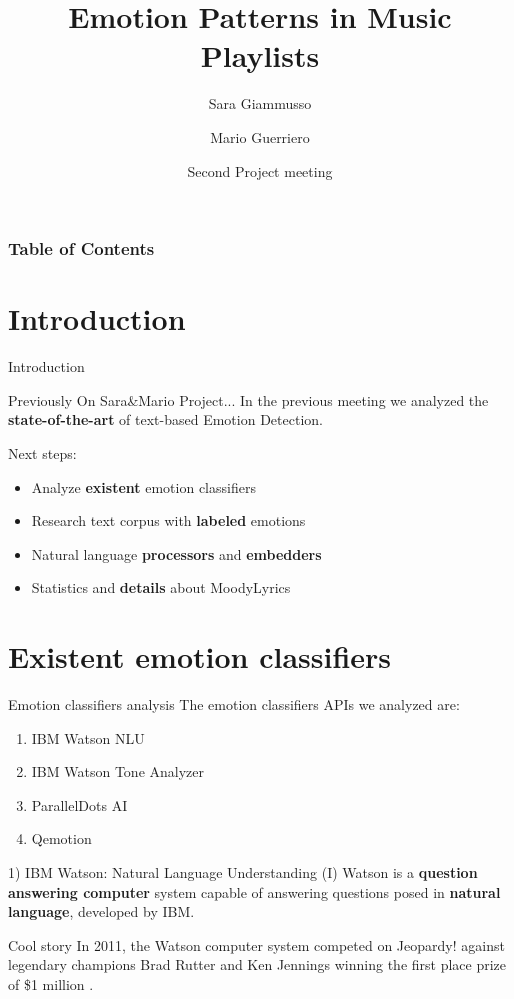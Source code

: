 \documentclass[xcolor=dvipsnames]{beamer}
\title[Emotion Patterns in Music Playlists] %
{Emotion Patterns in Music Playlists}
\author[Sara, Mario] %
{Sara Giammusso\inst{1}\inst{2} \and Mario Guerriero \inst{1}\inst{2}}
\institute[EURECOM] %
{
 \inst{1}
 MSc student in Data Science Department, EURECOM, T\'el\'ecom ParisTech, France\\
  \inst{2}%
 MSc student in Department of Control and Computer Engineering, Politecnico di Torino, Italy
}
\date[2018 March 27] %
{Second Project meeting}
\begin{document}
\frame{\titlepage}

\begin{frame}
\frametitle{Table of Contents}
\tableofcontents
\end{frame}

\section{Introduction}
\begin{frame}{Introduction}
\begin{block}{Previously On Sara\&Mario Project...}
In the previous meeting we analyzed the \textbf{state-of-the-art} of text-based Emotion Detection.\\
\end{block}
Next steps:
\begin{itemize}
\item Analyze \textbf{existent} emotion classifiers
\item Research text corpus with \textbf{labeled} emotions
\item Natural language \textbf{processors} and \textbf{embedders}
\item Statistics and \textbf{details} about MoodyLyrics
\end{itemize}



\end{frame}

\section{Existent emotion classifiers}

\begin{frame}{Emotion classifiers analysis}
The emotion classifiers APIs we analyzed are: 
\begin{enumerate}
\item IBM Watson NLU
\item IBM Watson Tone Analyzer
\item ParallelDots AI
\item Qemotion
\end{enumerate}
\end{frame}

\begin{frame}{1) IBM Watson: Natural Language Understanding (I)}
Watson is a \textbf{question answering computer} system capable of answering questions posed in \textbf{natural language}, developed by IBM.\cite{p2}
\begin{block}{Cool story}
In 2011, the Watson computer system competed on Jeopardy! against legendary champions Brad Rutter and Ken Jennings winning the first place prize of \$1 million \cite{p2}.
\end{block}
\end{frame}
\end{document}
